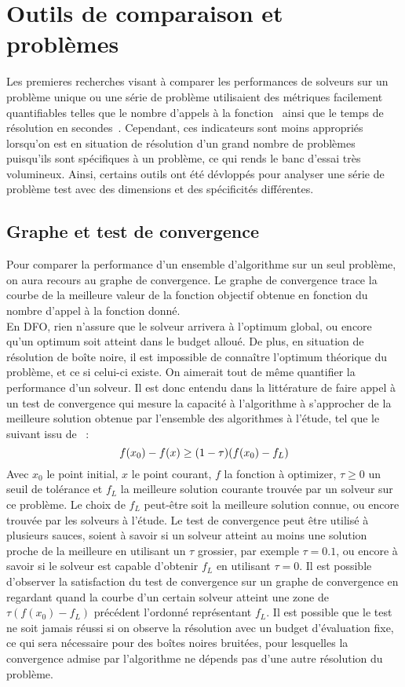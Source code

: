 \label{sec:Theme3}
\section{Outils de comparaison et problèmes}
Les premieres recherches visant à comparer les performances de solveurs sur un problème unique ou une série de problème utilisaient des métriques facilement quantifiables telles que le nombre d'appels à la fonction~\cite{BoCoGoTo1995} ainsi que le temps de résolution en secondes~\cite{Mi99}. Cependant, ces indicateurs sont moins appropriés lorsqu'on est en situation de résolution d'un grand nombre de problèmes puisqu'ils sont spécifiques à un problème, ce qui rends le banc d'essai très volumineux. Ainsi, certains outils ont été dévloppés pour analyser une série de problème test avec des dimensions et des spécificités différentes.
	\subsection{Graphe et test de convergence}
	Pour comparer la performance d'un ensemble d'algorithme sur un seul problème, on aura recours au graphe de convergence. Le graphe de convergence trace la courbe de la meilleure valeur de la fonction objectif obtenue en fonction du nombre d'appel à la fonction donné.\\
	En DFO, rien n'assure que le solveur arrivera à l'optimum global, ou encore qu'un optimum soit atteint dans le budget alloué. De plus, en situation de résolution de boîte noire, il est impossible de connaître l'optimum théorique du problème, et ce si celui-ci existe. On aimerait tout de même quantifier la performance d'un solveur.  Il est donc entendu dans la littérature de faire appel à un test de convergence qui mesure la capacité à l'algorithme à s'approcher de la meilleure solution obtenue par l'ensemble des algorithmes à l'étude, tel que le suivant issu de~\cite{MaNo02a} : 
	\begin{equation*}
	f(x_0) - f(x) \geq (1-\tau)(f(x_0)-f_L)\\
	\end{equation*} 
	Avec $x_0$ le point initial, $x$ le point courant, $f$ la fonction à optimizer, $\tau\geq0$ un seuil de tolérance et $f_L$ la meilleure solution courante trouvée par un solveur sur ce problème. Le choix de $f_L$ peut-être soit la meilleure solution connue, ou encore trouvée par les solveurs à l'étude. Le test de convergence peut être utilisé à plusieurs sauces, soient à savoir si un solveur atteint au moins une solution proche de la meilleure en utilisant un $\tau$ grossier, par exemple $\tau = 0.1$, ou encore à savoir si le solveur est capable d'obtenir $f_L$ en utilisant $\tau =0$. Il est possible d'observer la satisfaction du test de convergence sur un graphe de convergence en regardant quand la courbe d'un certain solveur atteint une zone de $\tau(f(x_0)-f_L)$ précédent l'ordonné représentant $f_L$. Il est possible que le test ne soit jamais réussi si on observe la résolution avec un budget d'évaluation fixe, ce qui sera nécessaire pour des boîtes noires bruitées, pour lesquelles la convergence admise par l'algorithme ne dépends pas d'une autre résolution du problème.
